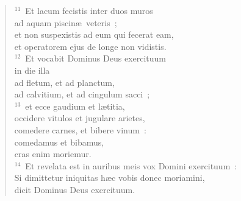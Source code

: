 \begin{flushleft}
\begin{verse}
${}^{11}$~Et lacum fecistis inter duos muros\\ ad aquam piscin\ae\ veteris~;\\ et non suspexistis ad eum qui fecerat eam,\\ et operatorem ejus de longe non vidistis.\\
${}^{12}$~Et vocabit Dominus Deus exercituum\\ in die illa\\ ad fletum, et ad planctum,\\ ad calvitium, et ad cingulum sacci~;\\
${}^{13}$~et ecce gaudium et l\ae titia,\\ occidere vitulos et jugulare arietes,\\ comedere carnes, et bibere vinum~:\\ comedamus et bibamus,\\ cras enim moriemur.\\
${}^{14}$~Et revelata est in auribus meis vox Domini exercituum~:\\ Si dimittetur iniquitas h\ae c vobis donec moriamini,\\ dicit Dominus Deus exercituum.\end{verse}\end{flushleft}


